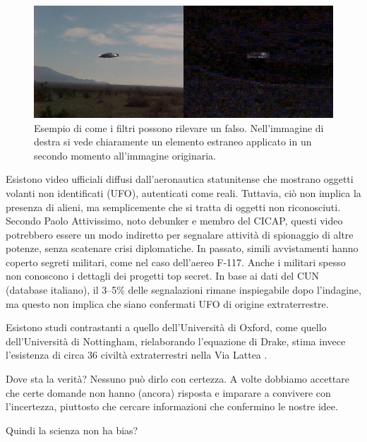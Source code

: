 \documentclass[12pt]{book} %
\begin{document}
\begin{mdframed}[linewidth=1pt]
\needspace{4cm}
\begin{figure}[H]
  \begin{minipage}{16cm}
    \includegraphics[width=16cm]{images/Libro-img053.jpg}
    \caption{Esempio di come i filtri possono rilevare un falso. Nell'immagine di destra si vede chiaramente un elemento estraneo applicato in un secondo momento all'immagine originaria.}
  \end{minipage}
\end{figure}

Esistono video ufficiali diffusi dall’aeronautica statunitense che mostrano oggetti volanti non identificati (UFO), autenticati come reali. Tuttavia, ciò non implica la presenza di alieni, ma semplicemente che si tratta di oggetti non riconosciuti. Secondo Paolo Attivissimo, noto debunker e membro del CICAP, questi video potrebbero essere un modo indiretto per segnalare attività di spionaggio di altre potenze, senza scatenare crisi diplomatiche. In passato, simili avvistamenti hanno coperto segreti militari, come nel caso dell’aereo F-117. Anche i militari spesso non conoscono i dettagli dei progetti top secret. In base ai dati del CUN (database italiano), il 3–5\% delle segnalazioni rimane inspiegabile dopo l’indagine, ma questo non implica che siano confermati UFO di origine extraterrestre.

Esistono studi contrastanti a quello dell’Università di Oxford, come quello dell’Università di Nottingham, rielaborando l’equazione di Drake, stima invece l’esistenza di circa 36 civiltà extraterrestri nella Via Lattea .

Dove sta la verità? Nessuno può dirlo con certezza. A volte dobbiamo accettare che certe domande non hanno (ancora) risposta e imparare a convivere con l’incertezza, piuttosto che cercare informazioni che confermino le nostre idee.
\end{mdframed}

Quindi la scienza non ha bias?
\end{document}
